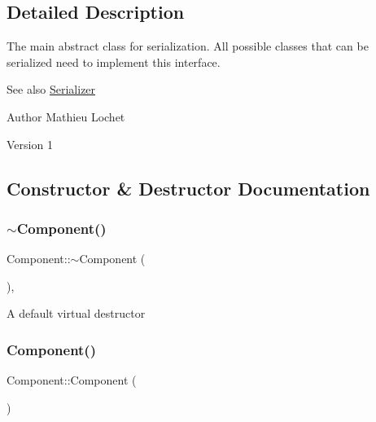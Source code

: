 \subsection{Detailed Description}
The main abstract class for serialization. All possible classes that can be serialized need to implement this interface. \begin{DoxySeeAlso}{See also}
\mbox{\hyperlink{classSerializer}{Serializer}}
\end{DoxySeeAlso}
\begin{DoxyAuthor}{Author}
Mathieu Lochet 
\end{DoxyAuthor}
\begin{DoxyVersion}{Version}
1 
\end{DoxyVersion}


\subsection{Constructor \& Destructor Documentation}
\mbox{\label{classComponent_ab8378fa275af98e568a7e91d33d867af}} 
\subsubsection{\texorpdfstring{$\sim$\+Component()}{~Component()}}
{\footnotesize\ttfamily Component\+::$\sim$\+Component (\begin{DoxyParamCaption}{ }\end{DoxyParamCaption})\hspace{0.3cm}{\ttfamily [virtual]}, {\ttfamily [default]}}

A default virtual destructor \mbox{\label{classComponent_a8775db6d1a2c1afc2e77cd3c8f39da6f}} 
\subsubsection{\texorpdfstring{Component()}{Component()}}
{\footnotesize\ttfamily Component\+::\+Component (\begin{DoxyParamCaption}{ }\end{DoxyParamCaption})\hspace{0.3cm}{\ttfamily [default]}}

